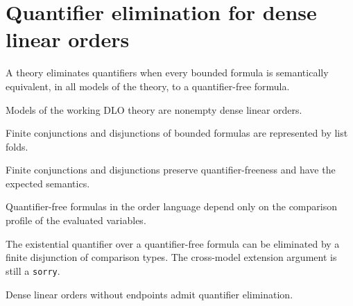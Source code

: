 \section{Quantifier elimination for dense linear orders}

\begin{definition}
\label{def:dlo-qe}
\leanok
A theory eliminates quantifiers when every bounded formula is semantically equivalent, in all models of the theory, to a quantifier-free formula.
\end{definition}

\begin{lemma}
\label{lem:dlo-models}
\leanok
Models of the working DLO theory are nonempty dense linear orders.
\end{lemma}

\begin{definition}
\label{def:dlo-big}
\leanok
Finite conjunctions and disjunctions of bounded formulas are represented by list folds.
\end{definition}

\begin{lemma}
\label{lem:dlo-big-qf}
\leanok
{}
Finite conjunctions and disjunctions preserve quantifier-freeness and have the expected semantics.
\end{lemma}

\begin{lemma}
\label{lem:dlo-invariant}
\leanok
Quantifier-free formulas in the order language depend only on the comparison profile of the evaluated variables.
\end{lemma}

\begin{lemma}
\label{lem:dlo-exists}
\notready
{}
The existential quantifier over a quantifier-free formula can be eliminated by a finite disjunction of comparison types. The cross-model extension argument is still a \texttt{sorry}.
\end{lemma}

\begin{theorem}
\label{thm:dlo-qe}
\notready
{}
Dense linear orders without endpoints admit quantifier elimination.
\end{theorem}
